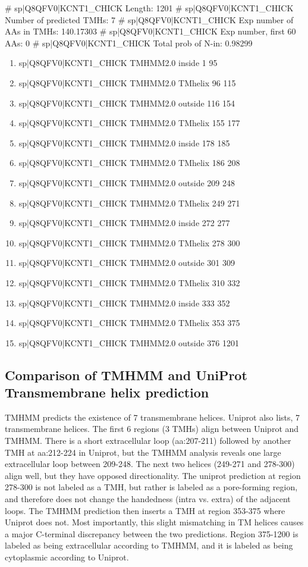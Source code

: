 \documentclass[11pt]{article}
\begin{document}
# sp|Q8QFV0|KCNT1\_CHICK Length: 1201
# sp|Q8QFV0|KCNT1\_CHICK Number of predicted TMHs:  7
# sp|Q8QFV0|KCNT1\_CHICK Exp number of AAs in TMHs: 140.17303
# sp|Q8QFV0|KCNT1\_CHICK Exp number, first 60 AAs:  0
# sp|Q8QFV0|KCNT1\_CHICK Total prob of N-in:        0.98299
\begin{enumerate}
\item sp|Q8QFV0|KCNT1\_CHICK	TMHMM2.0	inside	     1    95
\item sp|Q8QFV0|KCNT1\_CHICK	TMHMM2.0	TMhelix	    96   115
\item sp|Q8QFV0|KCNT1\_CHICK	TMHMM2.0	outside	   116   154
\item sp|Q8QFV0|KCNT1\_CHICK	TMHMM2.0	TMhelix	   155   177
\item sp|Q8QFV0|KCNT1\_CHICK	TMHMM2.0	inside	   178   185
\item sp|Q8QFV0|KCNT1\_CHICK	TMHMM2.0	TMhelix	   186   208
\item sp|Q8QFV0|KCNT1\_CHICK	TMHMM2.0	outside	   209   248
\item sp|Q8QFV0|KCNT1\_CHICK	TMHMM2.0	TMhelix	   249   271
\item sp|Q8QFV0|KCNT1\_CHICK	TMHMM2.0	inside	   272   277
\item sp|Q8QFV0|KCNT1\_CHICK	TMHMM2.0	TMhelix	   278   300
\item sp|Q8QFV0|KCNT1\_CHICK	TMHMM2.0	outside	   301   309
\item sp|Q8QFV0|KCNT1\_CHICK	TMHMM2.0	TMhelix	   310   332
\item sp|Q8QFV0|KCNT1\_CHICK	TMHMM2.0	inside	   333   352
\item sp|Q8QFV0|KCNT1\_CHICK	TMHMM2.0	TMhelix	   353   375
\item sp|Q8QFV0|KCNT1\_CHICK	TMHMM2.0	outside	   376  1201
\end{enumerate}

\subsection*{Comparison of TMHMM and UniProt Transmembrane helix prediction}

TMHMM predicts the existence of 7 transmembrane helices. Uniprot also lists, 7 transmembrane helices. 
The first 6 regions (3 TMHs) align between Uniprot and TMHMM. There is a short extracellular loop (aa:207-211)
followed by another TMH at aa:212-224  in Uniprot, but the TMHMM analysis reveals one large
extracellular loop between 209-248. The next two helices (249-271 and 278-300) align well, but they have opposed directionality.
The uniprot prediction at region 278-300 is not labeled as a TMH, but rather is labeled as
a pore-forming region, and therefore does not change the handedness (intra vs. extra) of 
the adjacent loops. The TMHMM prediction then inserts a TMH at region 353-375 where Uniprot 
does not. Most importantly, this slight mismatching in TM helices causes a major
C-terminal discrepancy between the two predictions. Region 375-1200 is labeled 
as being extracellular according to TMHMM, and it is labeled as being cytoplasmic 
according to Uniprot.
\end{document}
